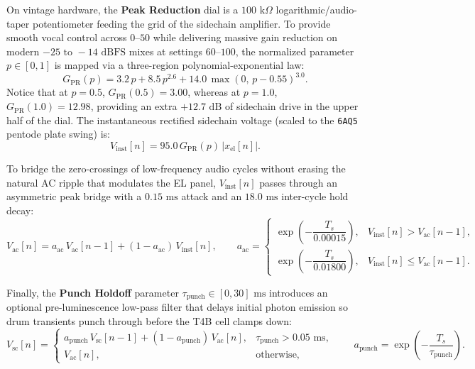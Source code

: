 \documentclass[11pt,a4paper]{article}
\begin{document}
On vintage hardware, the \textbf{Peak Reduction} dial is a $100\text{ k}\Omega$ logarithmic/audio-taper potentiometer feeding the grid of the sidechain amplifier. To provide smooth vocal control across $0\text{--}50$ while delivering massive gain reduction on modern $-25\text{ to }-14\text{ dBFS}$ mixes at settings $60\text{--}100$, the normalized parameter $p \in [0, 1]$ is mapped via a three-region polynomial-exponential law:
\begin{equation}
    G_{\text{PR}}(p) = 3.2\,p + 8.5\,p^{2.6} + 14.0\,\max(0,\,p - 0.55)^{3.0}.
    \label{eq:pr_taper}
\end{equation}
Notice that at $p = 0.5$, $G_{\text{PR}}(0.5) = 3.00$, whereas at $p = 1.0$, $G_{\text{PR}}(1.0) = 12.98$, providing an extra $+12.7\text{ dB}$ of sidechain drive in the upper half of the dial. The instantaneous rectified sidechain voltage (scaled to the \texttt{6AQ5} pentode plate swing) is:
\begin{equation}
    V_{\text{inst}}[n] = 95.0 \, G_{\text{PR}}(p) \, \bigl|x_{\text{el}}[n]\bigr|.
\end{equation}

To bridge the zero-crossings of low-frequency audio cycles without erasing the natural AC ripple that modulates the EL panel, $V_{\text{inst}}[n]$ passes through an asymmetric peak bridge with a $0.15\text{ ms}$ attack and an $18.0\text{ ms}$ inter-cycle hold decay:
\begin{equation}
    V_{\text{ac}}[n] = a_{\text{ac}}\,V_{\text{ac}}[n-1] + (1 - a_{\text{ac}})\,V_{\text{inst}}[n], \qquad
    a_{\text{ac}} = \begin{cases}
        \exp\!\left(-\dfrac{T_s}{0.00015}\right), & V_{\text{inst}}[n] > V_{\text{ac}}[n-1], \\[1.0em]
        \exp\!\left(-\dfrac{T_s}{0.01800}\right), & V_{\text{inst}}[n] \le V_{\text{ac}}[n-1].
    \end{cases}
\end{equation}

Finally, the \textbf{Punch Holdoff} parameter $\tau_{\text{punch}} \in [0, 30]\text{ ms}$ introduces an optional pre-luminescence low-pass filter that delays initial photon emission so drum transients punch through before the T4B cell clamps down:
\begin{equation}
    V_{\text{sc}}[n] = \begin{cases}
        a_{\text{punch}}\,V_{\text{sc}}[n-1] + (1 - a_{\text{punch}})\,V_{\text{ac}}[n], & \tau_{\text{punch}} > 0.05\text{ ms}, \\
        V_{\text{ac}}[n], & \text{otherwise},
    \end{cases}
    \qquad a_{\text{punch}} = \exp\!\left(-\frac{T_s}{\tau_{\text{punch}}}\right).
\end{equation}
\end{document}
